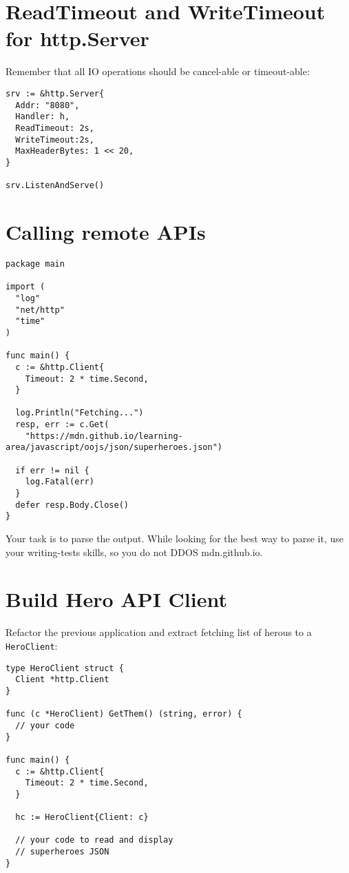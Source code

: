 \documentclass[11pt, letterpaper]{article}
\begin{document}
\section{ReadTimeout and WriteTimeout for http.Server}
Remember that all IO operations should be cancel-able or timeout-able:

\begin{verbatim}
srv := &http.Server{
  Addr: "8080",
  Handler: h,
  ReadTimeout: 2s,
  WriteTimeout:2s,
  MaxHeaderBytes: 1 << 20,
}

srv.ListenAndServe()
\end{verbatim}

\pagebreak
\section{Calling remote APIs}

\begin{verbatim}
package main

import (
  "log"
  "net/http"
  "time"
)

func main() {
  c := &http.Client{
    Timeout: 2 * time.Second,
  }

  log.Println("Fetching...")
  resp, err := c.Get(
    "https://mdn.github.io/learning-area/javascript/oojs/json/superheroes.json")

  if err != nil {
    log.Fatal(err)
  }
  defer resp.Body.Close()
}
\end{verbatim}

Your task is to parse the output. While looking for the best way to parse it, use your writing-tests skills, so you do not DDOS mdn.github.io.

\section{Build Hero API Client}

Refactor the previous application and extract fetching list of herous to a \verb|HeroClient|:

\begin{verbatim}
type HeroClient struct {
  Client *http.Client
}

func (c *HeroClient) GetThem() (string, error) {
  // your code
}

func main() {
  c := &http.Client{
    Timeout: 2 * time.Second,
  }

  hc := HeroClient{Client: c}
  
  // your code to read and display 
  // superheroes JSON
}
\end{verbatim}
\end{document}
